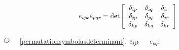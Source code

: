 \nopagebreak\vspace{-0.1em}
\begin{equation}\label{theproductoftwopermutations}
e_{i\hspace{-0.1ex}j\hspace{-0.1ex}k} \hspace{.1ex} e_{pqr}
\hspace{-0.1ex} = \hspace{.1ex}
\operatorname{det} \hspace{-0.25ex} \left[
\begin{array}{ccc}
\delta_{ip} & \delta_{iq} & \delta_{ir} \\
\delta_{\hspace{-0.1ex}j\hspace{-0.1ex}p} & \delta_{\hspace{-0.1ex}j\hspace{-0.1ex}q} & \delta_{\hspace{-0.1ex}j\hspace{-0.1ex}r} \\
\delta_{kp} & \delta_{kq} & \delta_{kr}
\end{array}\hspace{-0.1ex}
\right]
\end{equation}

\noindent
${ \tikz[baseline=-1ex] \draw [line width=.5pt, color=black, fill=white] (0, 0) circle (.8ex);
\hspace{.6em} }$
~\eqref{permutationsymbolasdeterminant},
${ e_{i\hspace{-0.1ex}j\hspace{-0.1ex}k} }$~
~${ e_{pqr} }$~

